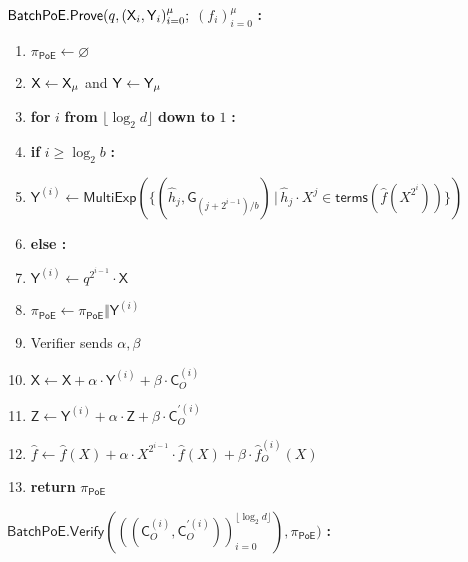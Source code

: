 \documentclass{article}
\theoremstyle{definition}
\begin{document}
\begin{mdframed}
$\mathsf{BatchPoE.Prove}(q,(\mathsf{X}_i, \mathsf{Y}_i)_{i=0}^{\mu};$ $(f_i)_{i=0}^\mu$ \textbf{:} 
\begin{enumerate}[nolistsep]
	\item $\pi_{\mathsf{PoE}} \gets \varnothing$
	\item $\mathsf{X} \gets \mathsf{X}_\mu$ and $\mathsf{Y} \gets \mathsf{Y}_\mu $
	\item \textbf{for} $i$ \textbf{from} $\lfloor \log_2 d \rfloor$ \textbf{down to} $1$ \textbf{:}
	\item \pcind \textbf{if} $i \geq \log_2 b$ \textbf{:} 
	\item \pcind \pcind $\mathsf{Y}^{(i)} \gets \mathsf{MultiExp}(\{(\hat{h}_j, \mathsf{G}_{(j+2^{i-1})/b}) \, | \, \hat{h}_j \cdot X^j \in \mathsf{terms}(\hat{f}(X^{2^i})) \})$ \label{line:batchpoeprove-big}
	\item \pcind \textbf{else :}
	\item \pcind \pcind $\mathsf{Y}^{(i)} \gets q^{2^{i-1}} \cdot \mathsf{X}$ \label{line:batchpoeprove-small}
	\item \pcind $\pi_{\mathsf{PoE}} \gets \pi_{\mathsf{PoE}} \Vert \mathsf{Y}^{(i)}$
	\item \pcind Verifier sends $\alpha, \beta$ 
	\item \pcind $\mathsf{X} \gets \mathsf{X} + \alpha \cdot \mathsf{Y}^{(i)} + \beta \cdot \mathsf{C}_O^{(i)}$ \label{line:batchpoeprove-regular}
	\item \pcind $\mathsf{Z} \gets \mathsf{Y}^{(i)} + \alpha \cdot \mathsf{Z} + \beta \cdot \mathsf{C}_O^{\prime(i)}$\label{line:batchpoeprove-prime}
	\item \pcind $\hat{f} \gets \hat{f}(X) + \alpha \cdot X^{2^{i-1}} \cdot \hat{f}(X) + \beta \cdot \hat{f}^{(i)}_O(X)$
	\item \textbf{return} $\pi_{\mathsf{PoE}}$
\end{enumerate}
$\mathsf{BatchPoE.Verify}(((\mathsf{C}_O^{(i)}, \mathsf{C}_O^{\prime(i)}))_{i=0}^{\lfloor \log_2 d \rfloor}), \pi_{\mathsf{PoE}})$ \textbf{:}
\begin{enumerate}[nolistsep]

\end{enumerate}
\end{mdframed}
\end{document}
